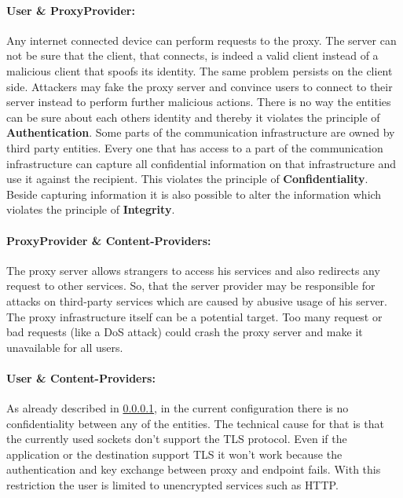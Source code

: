 \documentclass[12pt, a4paper]{scrartcl}
\begin{document}
\paragraph{User \& ProxyProvider:}\label{ssec::user}
\noindent Any internet connected device can perform requests to the proxy. The server can not be sure that the client, that connects, is indeed a valid client instead of a malicious client that spoofs its identity. The same problem persists on the client side. Attackers may fake the proxy server and convince users to connect to their server instead to perform further malicious actions. There is no way the entities can be sure about each others identity and thereby it violates the principle of \textbf{Authentication}.\newline
Some parts of the communication infrastructure are owned by third party entities. Every one that has access to a part of the communication infrastructure can capture all confidential information on that infrastructure and use it against the recipient. This violates the principle of \textbf{Confidentiality}.\newline
Beside capturing information it is also possible to alter the information which violates the principle of \textbf{Integrity}.
\paragraph{ProxyProvider \& Content-Providers:}
The proxy server allows strangers to access his services and also redirects any request to other services. So, that the server provider may be responsible for attacks on third-party services which are caused by abusive usage of his server.\newline
The proxy infrastructure itself can be a potential target. Too many request or bad requests (like a \ac{DoS} attack) could crash the proxy server and make it unavailable for all users.
\paragraph{User \& Content-Providers:}
As already described in \@\ref{ssec::user}, in the current configuration there is no confidentiality between any of the entities. The technical cause for that is that the currently used sockets don't support the \ac{TLS} protocol. Even if the application or the destination support \ac{TLS} it won't work because the authentication and key exchange between proxy and endpoint fails. With this restriction the user is limited to unencrypted services such as \acs{HTTP}.
\end{document}
